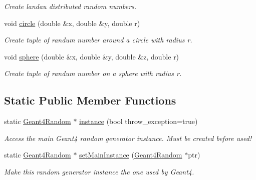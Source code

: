 \begin{DoxyCompactItemize}
\begin{DoxyCompactList}\small\item\em Create landau distributed random numbers. \end{DoxyCompactList}\item 
void \hyperlink{class_d_d4hep_1_1_simulation_1_1_geant4_random_a1319236bb57ff830f1d575dbe928cb01}{circle} (double \&x, double \&y, double r)
\begin{DoxyCompactList}\small\item\em Create tuple of randum number around a circle with radius r. \end{DoxyCompactList}\item 
void \hyperlink{class_d_d4hep_1_1_simulation_1_1_geant4_random_af0825e540ad54e3510b4e5a1450a3211}{sphere} (double \&x, double \&y, double \&z, double r)
\begin{DoxyCompactList}\small\item\em Create tuple of randum number on a sphere with radius r. \end{DoxyCompactList}\end{DoxyCompactItemize}
\subsection*{Static Public Member Functions}
\begin{DoxyCompactItemize}
\item 
static \hyperlink{class_d_d4hep_1_1_simulation_1_1_geant4_random}{Geant4\+Random} $\ast$ \hyperlink{class_d_d4hep_1_1_simulation_1_1_geant4_random_a76e4bbadf0c58d9f6ee05decdd200fe6}{instance} (bool throw\+\_\+exception=true)
\begin{DoxyCompactList}\small\item\em Access the main Geant4 random generator instance. Must be created before used! \end{DoxyCompactList}\item 
static \hyperlink{class_d_d4hep_1_1_simulation_1_1_geant4_random}{Geant4\+Random} $\ast$ \hyperlink{class_d_d4hep_1_1_simulation_1_1_geant4_random_a544fa42f6ae0d64697e366da5e1297b2}{set\+Main\+Instance} (\hyperlink{class_d_d4hep_1_1_simulation_1_1_geant4_random}{Geant4\+Random} $\ast$ptr)
\begin{DoxyCompactList}\small\item\em Make this random generator instance the one used by Geant4. \end{DoxyCompactList}\end{DoxyCompactItemize}
